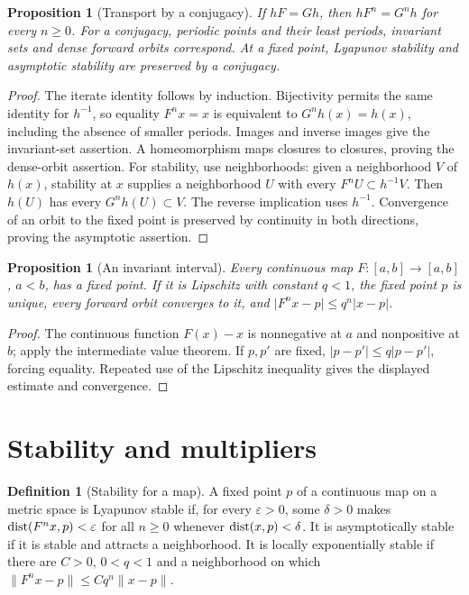 \documentclass[11pt,oneside]{book}
\newtheorem{proposition}[theorem]{Proposition}
\theoremstyle{definition}
\newtheorem{definition}[theorem]{Definition}
\theoremstyle{remark}\newtheorem{remark}[theorem]{Remark}
\newcommand{\abs}[1]{\lvert#1\rvert}\newcommand{\norm}[1]{\lVert#1\rVert}
\begin{document}
\begin{proposition}[Transport by a conjugacy]\label{d13:15:conjugacy-transport}
If \(hF=Gh\), then \(hF^n=G^nh\) for every \(n\geq0\). For a conjugacy,
periodic points and their least periods, invariant sets and dense forward
orbits correspond. At a fixed point, Lyapunov stability and asymptotic
stability are preserved by a conjugacy.
\end{proposition}
\begin{proof}
The iterate identity follows by induction. Bijectivity permits the same
identity for \(h^{-1}\), so equality \(F^nx=x\) is equivalent to
\(G^nh(x)=h(x)\), including the absence of smaller periods. Images and
inverse images give the invariant-set assertion. A homeomorphism maps
closures to closures, proving the dense-orbit assertion. For stability,
use neighborhoods: given a neighborhood \(V\) of \(h(x)\), stability at
\(x\) supplies a neighborhood \(U\) with every \(F^nU\subset h^{-1}V\).
Then \(h(U)\) has every \(G^nh(U)\subset V\). The reverse implication uses
\(h^{-1}\). Convergence of an orbit to the fixed point is preserved by
continuity in both directions, proving the asymptotic assertion.
\end{proof}

\begin{proposition}[An invariant interval]\label{d13:15:interval-fixed-point}
Every continuous map \(F:[a,b]\to[a,b]\), \(a<b\), has a fixed point.
If it is Lipschitz with constant \(q<1\), the fixed point \(p\) is unique,
every forward orbit converges to it, and
\(\abs{F^nx-p}\leq q^n\abs{x-p}\).
\end{proposition}
\begin{proof}
The continuous function \(F(x)-x\) is nonnegative at \(a\) and nonpositive
at \(b\); apply the intermediate value theorem. If \(p,p'\) are fixed,
\(\abs{p-p'}\leq q\abs{p-p'}\), forcing equality. Repeated use of the
Lipschitz inequality gives the displayed estimate and convergence.
\end{proof}

\section{Stability and multipliers}

\begin{definition}[Stability for a map]\label{d13:15:stability-definition}
A fixed point \(p\) of a continuous map on a metric space is Lyapunov stable
if, for every \(\varepsilon>0\), some \(\delta>0\) makes
\(\operatorname{dist}(F^nx,p)<\varepsilon\) for all \(n\geq0\) whenever
\(\operatorname{dist}(x,p)<\delta\). It is asymptotically stable if it is stable and attracts
a neighborhood. It is locally exponentially stable if there are \(C>0\),
\(0<q<1\) and a neighborhood on which
\(\norm{F^nx-p}\leq Cq^n\norm{x-p}\).
\end{definition}
\end{document}
